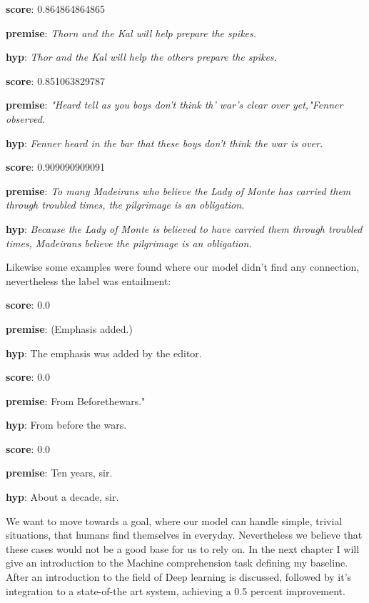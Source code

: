 \textbf{score}: 0.864864864865

\textbf{premise}: \textit{Thorn and the Kal will help prepare the spikes.}

\textbf{hyp}: \textit{Thor and the Kal will help the others prepare the spikes. }
\linebreak

\textbf{score}: 0.851063829787

\textbf{premise}:  \textit{"Heard tell as you boys don't think th' war's clear over yet,"Fenner observed.}

\textbf{hyp}: \textit{Fenner heard in the bar that these boys don't think the war is over.}
\linebreak

\textbf{score}: 0.909090909091

\textbf{premise}: \textit{To many Madeirans who believe the Lady of Monte has carried them through troubled times, the pilgrimage is an obligation.}

\textbf{hyp}: \textit{Because the Lady of Monte is believed to have carried them through troubled times, Madeirans believe the pilgrimage is an obligation.}
\linebreak

Likewise some examples were found where our model didn't find any connection, nevertheless the label was entailment:

\textbf{score}: 0.0

\textbf{premise}: (Emphasis added.)

\textbf{hyp}: The emphasis was added by the editor.
\linebreak

\textbf{score}: 0.0

\textbf{premise}: From Beforethewars."

\textbf{hyp}: From before the wars.
\linebreak

\textbf{score}: 0.0

\textbf{premise}: Ten years, sir.

\textbf{hyp}: About a decade, sir.
\linebreak

We want to move towards a goal, where our model can handle simple, trivial situations, that humans find themselves in everyday. Nevertheless we believe that these cases would not be a good base for us to rely on.
In the next chapter I will give an introduction to the Machine comprehension task defining my baseline. After an introduction to the field of Deep learning is discussed, followed by it's integration to a state-of-the art system, achieving a 0.5 percent improvement.